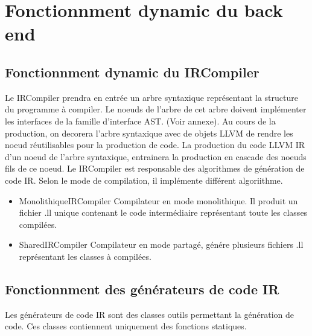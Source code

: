 \documentclass{article}
\begin{document}
\section{Fonctionnment dynamic du back end}

\subsection{Fonctionnment dynamic du IRCompiler}

Le IRCompiler prendra en entrée un arbre syntaxique représentant la structure du programme à compiler.
Le noeuds de l'arbre de cet arbre doivent implémenter les interfaces de la famille d'interface AST. (Voir annexe).
Au cours de la production, on decorera l'arbre syntaxique avec de objets LLVM de rendre les noeud réutilisables
pour la production de code. La production du code LLVM IR d'un noeud de l'arbre syntaxique, entrainera la production en cascade des noeuds fils de ce noeud. Le IRCompiler est responsable des algorithmes de génération de code IR. Selon le mode de compilation,
il implémente différent algoriithme. \\
 \begin{itemize}
	\item MonolithiqueIRCompiler Compilateur en mode monolithique. Il produit un fichier .ll unique contenant le code intermédiaire 
	représentant toute les classes compilées. 
	\item SharedIRCompiler Compilateur en mode partagé, génére plusieurs fichiers .ll représentant les classes à compilées.
	\end{itemize}

\subsection{Fonctionnment des générateurs de code IR}

   Les générateurs de code IR sont des classes outils permettant la génération de code. Ces classes contiennent uniquement des fonctions statiques.
\end{document}

